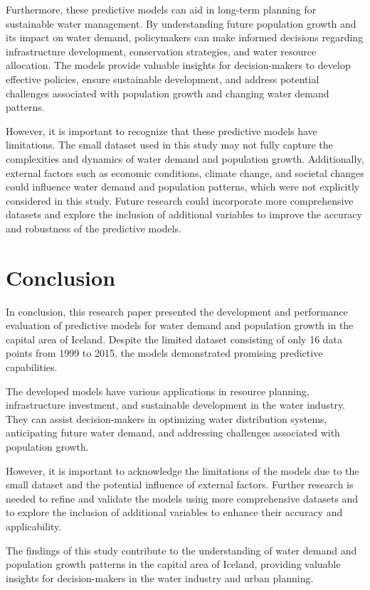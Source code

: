 \documentclass{article}
\begin{document}
Furthermore, these predictive models can aid in long-term planning for sustainable water management. By understanding future population growth and its impact on water demand, policymakers can make informed decisions regarding infrastructure development, conservation strategies, and water resource allocation. The models provide valuable insights for decision-makers to develop effective policies, ensure sustainable development, and address potential challenges associated with population growth and changing water demand patterns.

However, it is important to recognize that these predictive models have limitations. The small dataset used in this study may not fully capture the complexities and dynamics of water demand and population growth. Additionally, external factors such as economic conditions, climate change, and societal changes could influence water demand and population patterns, which were not explicitly considered in this study. Future research could incorporate more comprehensive datasets and explore the inclusion of additional variables to improve the accuracy and robustness of the predictive models.

\section{Conclusion}
In conclusion, this research paper presented the development and performance evaluation of predictive models for water demand and population growth in the capital area of Iceland. Despite the limited dataset consisting of only 16 data points from 1999 to 2015, the models demonstrated promising predictive capabilities.

The developed models have various applications in resource planning, infrastructure investment, and sustainable development in the water industry. They can assist decision-makers in optimizing water distribution systems, anticipating future water demand, and addressing challenges associated with population growth.

However, it is important to acknowledge the limitations of the models due to the small dataset and the potential influence of external factors. Further research is needed to refine and validate the models using more comprehensive datasets and to explore the inclusion of additional variables to enhance their accuracy and applicability.

The findings of this study contribute to the understanding of water demand and population growth patterns in the capital area of Iceland, providing valuable insights for decision-makers in the water industry and urban planning.



\end{document}
